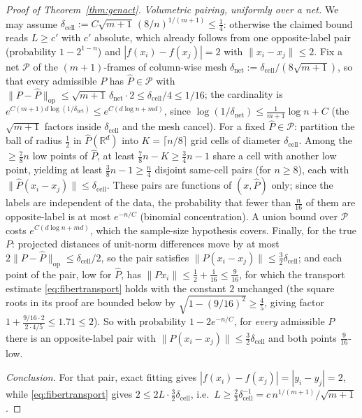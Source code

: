 \documentclass[11pt,reqno]{amsart}
\theoremstyle{plain}
\theoremstyle{definition}
\theoremstyle{remark}
\newcommand{\R}{\mathbb{R}}
\begin{document}
\begin{proof}[Proof of Theorem~\textup{\ref{thm:genact}}]
\emph{Volumetric pairing, uniformly over a net.} We may assume $\delta_{\mathrm{cell}}:=C\sqrt{m+1}\,(8/n)^{1/(m+1)}\le\tfrac14$: otherwise the claimed bound reads $L\ge c'$ with $c'$ absolute, which already follows from one opposite-label pair (probability $1-2^{1-n}$) and $|f(x_i)-f(x_j)|=2$ with $\|x_i-x_j\|\le2$. Fix a net $\mathcal P$ of the $(m{+}1)$-frames of column-wise mesh $\delta_{\mathrm{net}}:=\delta_{\mathrm{cell}}/(8\sqrt{m+1})$, so that every admissible $P$ has $\hat P\in\mathcal P$ with $\|P-\hat P\|_{\mathrm{op}}\le\sqrt{m+1}\,\delta_{\mathrm{net}}\cdot2\le\delta_{\mathrm{cell}}/4\le1/16$; the cardinality is $e^{C(m+1)d\log(1/\delta_{\mathrm{net}})}\le e^{C(d\log n+md)}$, since $\log(1/\delta_{\mathrm{net}})\le\tfrac1{m+1}\log n+C$ (the $\sqrt{m+1}$ factors inside $\delta_{\mathrm{cell}}$ and the mesh cancel). For a fixed $\hat P\in\mathcal P$: partition the ball of radius $\tfrac12$ in $\hat P(\R^d)$ into $K=\lceil n/8\rceil$ grid cells of diameter $\delta_{\mathrm{cell}}$. Among the $\ge\tfrac78n$ low points of $\hat P$, at least $\tfrac78n-K\ge\tfrac34n-1$ share a cell with another low point, yielding at least $\tfrac38n-1\ge\tfrac n4$ disjoint same-cell pairs (for $n\ge8$), each with $\|\hat P(x_i-x_j)\|\le\delta_{\mathrm{cell}}$. These pairs are functions of $(x,\hat P)$ only; since the labels are independent of the data, the probability that fewer than $\tfrac n{16}$ of them are opposite-label is at most $e^{-n/C}$ (binomial concentration). A union bound over $\mathcal P$ costs $e^{C(d\log n+md)}$, which the sample-size hypothesis covers. Finally, for the true $P$: projected distances of unit-norm differences move by at most $2\|P-\hat P\|_{\mathrm{op}}\le\delta_{\mathrm{cell}}/2$, so the pair satisfies $\|P(x_i-x_j)\|\le\tfrac32\delta_{\mathrm{cell}}$; and each point of the pair, low for $\hat P$, has $\|Px_i\|\le\tfrac12+\tfrac1{16}\le\tfrac9{16}$, for which the transport estimate \eqref{eq:fibertransport} holds with the constant $2$ unchanged (the square roots in its proof are bounded below by $\sqrt{1-(9/16)^2}\ge\tfrac45$, giving factor $1+\tfrac{9/16\cdot2}{2\cdot4/5}\le1.71\le2$). So with probability $1-2e^{-n/C}$, for \emph{every} admissible $P$ there is an opposite-label pair with $\|P(x_i-x_j)\|\le\tfrac32\delta_{\mathrm{cell}}$ and both points $\tfrac9{16}$-low.

\emph{Conclusion.} For that pair, exact fitting gives $|f(x_i)-f(x_j)|=|y_i-y_j|=2$, while \eqref{eq:fibertransport} gives $2\le2L\cdot\tfrac32\delta_{\mathrm{cell}}$, i.e.\ $L\ge\tfrac23\delta_{\mathrm{cell}}^{-1}=c\,n^{1/(m+1)}/\sqrt{m+1}$.
\end{proof}
\end{document}
